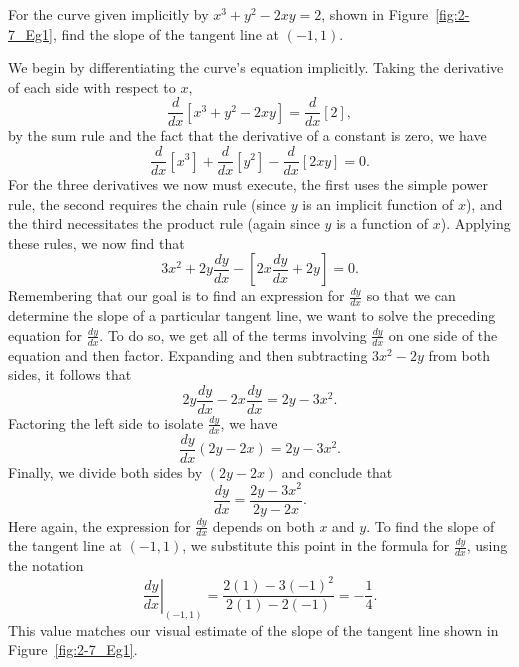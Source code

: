 \begin{example} \label{Ex:2.7.Eg1}
For the curve given implicitly by $x^3 + y^2 - 2xy = 2$, shown in Figure~\ref{fig:2-7_Eg1}, find the slope of the tangent line at $(-1,1)$.

\solution We begin by differentiating the curve's equation implicitly.  Taking the derivative of each side with respect to $x$,
$$\frac{d}{dx}\left[ x^3 + y^2 - 2xy \right] = \frac{d}{dx} \left[ 2 \right],$$
by the sum rule and the fact that the derivative of a constant is zero, we have
$$\frac{d}{dx}[x^3] + \frac{d}{dx}[y^2] - \frac{d}{dx}[2xy] = 0.$$
For the three derivatives we now must execute, the first uses the simple power rule, the second requires the chain rule (since $y$ is an implicit function of $x$), and the third necessitates the product rule (again since $y$ is a function of $x$).  Applying these rules, we now find that
$$3x^2 + 2y\frac{dy}{dx} - [2x \frac{dy}{dx} + 2y] = 0.$$
Remembering that our goal is to find an expression for $\frac{dy}{dx}$ so that we can determine the slope of a particular tangent line, we want to solve the preceding equation for $\frac{dy}{dx}$.  To do so, we get all of the terms involving $\frac{dy}{dx}$ on one side of the equation and then factor.  Expanding and then subtracting $3x^2 - 2y$ from both sides, it follows that
$$2y\frac{dy}{dx} - 2x \frac{dy}{dx}= 2y - 3x^2.$$
Factoring the left side to isolate $\frac{dy}{dx}$, we have
$$\frac{dy}{dx}(2y - 2x) = 2y - 3x^2.$$
Finally, we divide both sides by $(2y - 2x)$ and conclude that
$$\frac{dy}{dx} = \frac{2y-3x^2}{2y-2x}.$$
Here again, the expression for $\frac{dy}{dx}$ depends on both $x$ and $y$.  To find the slope of the tangent line at $(-1,1)$, we substitute this point in the formula for $\frac{dy}{dx}$, using the notation
$$ \left. \frac{dy}{dx} \right|_{(-1,1)} = \frac{2(1)-3(-1)^2}{2(1)-2(-1)} = -\frac14.$$
This value matches our visual estimate of the slope of the tangent line shown in Figure~\ref{fig:2-7_Eg1}.


\end{example}
